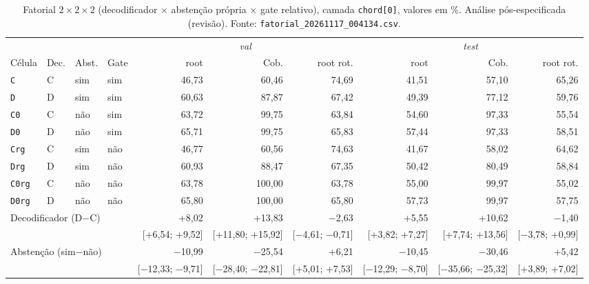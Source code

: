 \begin{table}[t]
  \centering
  \caption{Fatorial $2\times2\times2$ (decodificador $\times$ abstenção própria $\times$ gate relativo), camada \texttt{chord[0]}, valores em \%. Análise pós-especificada (revisão). Fonte: \texttt{fatorial\_20261117\_004134.csv}.}
  \label{tab:fatorial}
  \footnotesize
  \begin{tabular}{llllrrrrrr}
    \toprule
    & & & & \multicolumn{3}{c}{\emph{val}} & \multicolumn{3}{c}{\emph{test}} \\
    \cmidrule(lr){5-7} \cmidrule(lr){8-10}
    Célula & Dec. & Abst. & Gate & root & Cob. & root rot. & root & Cob. & root rot. \\
    \midrule
    \texttt{C} & C & sim & sim & 46,73 & 60,46 & 74,69 & 41,51 & 57,10 & 65,26 \\
    \texttt{D} & D & sim & sim & 60,63 & 87,87 & 67,42 & 49,39 & 77,12 & 59,76 \\
    \texttt{C0} & C & não & sim & 63,72 & 99,75 & 63,84 & 54,60 & 97,33 & 55,54 \\
    \texttt{D0} & D & não & sim & 65,71 & 99,75 & 65,83 & 57,44 & 97,33 & 58,51 \\
    \texttt{Crg} & C & sim & não & 46,77 & 60,56 & 74,63 & 41,67 & 58,02 & 64,62 \\
    \texttt{Drg} & D & sim & não & 60,93 & 88,47 & 67,35 & 50,42 & 80,49 & 58,84 \\
    \texttt{C0rg} & C & não & não & 63,78 & 100,00 & 63,78 & 55,00 & 99,97 & 55,02 \\
    \texttt{D0rg} & D & não & não & 65,80 & 100,00 & 65,80 & 57,73 & 99,97 & 57,75 \\
    \midrule
    \multicolumn{4}{l}{Decodificador (D$-$C)} & +8,02 & +13,83 & $-$2,63 & +5,55 & +10,62 & $-$1,40 \\
    \multicolumn{4}{l}{} & {\scriptsize [+6,54; +9,52]} & {\scriptsize [+11,80; +15,92]} & {\scriptsize [$-$4,61; $-$0,71]} & {\scriptsize [+3,82; +7,27]} & {\scriptsize [+7,74; +13,56]} & {\scriptsize [$-$3,78; +0,99]} \\
    \multicolumn{4}{l}{Abstenção (sim$-$não)} & $-$10,99 & $-$25,54 & +6,21 & $-$10,45 & $-$30,46 & +5,42 \\
    \multicolumn{4}{l}{} & {\scriptsize [$-$12,33; $-$9,71]} & {\scriptsize [$-$28,40; $-$22,81]} & {\scriptsize [+5,01; +7,53]} & {\scriptsize [$-$12,29; $-$8,70]} & {\scriptsize [$-$35,66; $-$25,32]} & {\scriptsize [+3,89; +7,02]} \\

\end{tabular}
\end{table}
